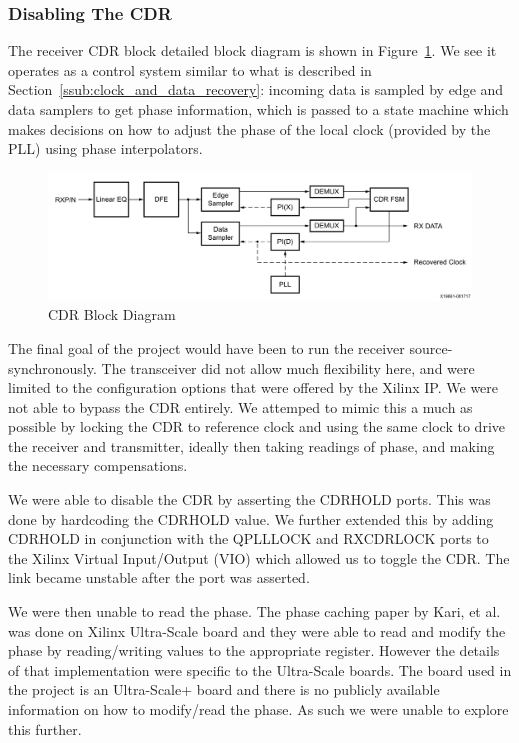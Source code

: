 \subsubsection{Disabling The CDR}%
\label{ssub:disabling_the_cdr}
The receiver CDR block detailed block diagram is shown in
Figure~\ref{fig:cdr_detail}. We see it operates as a control system similar to
what is described in Section~\ref{ssub:clock_and_data_recovery}:
incoming data is sampled by edge and data samplers to get phase information,
which is passed to a state machine which makes decisions on how to adjust
the phase of the local clock (provided by the PLL) using phase interpolators.

\begin{figure}[ht]
    \centering
    \hspace*{-1cm}\includegraphics[width=1.2\linewidth]{img/cdr_detail}
    \caption{CDR Block Diagram}%
    \label{fig:cdr_detail}
\end{figure}

The final goal of the project would have been to run the receiver
source-synchronously.  The transceiver did not allow much flexibility here, and
were limited to the configuration options that were offered by the Xilinx IP.
We were not able to bypass the CDR entirely. We attemped to mimic this a much
as possible by locking the CDR to reference clock and using the same clock to
drive the receiver and transmitter, ideally then taking readings of phase, and
making the necessary compensations.
 
We were able to disable the CDR by asserting the CDRHOLD ports. This was done
by hardcoding the CDRHOLD value. We further extended this by adding CDRHOLD in
conjunction with the QPLLLOCK and RXCDRLOCK ports to the Xilinx Virtual
Input/Output (VIO) which allowed us to toggle the CDR.  The link became
unstable after the port was asserted.  

We were then unable to read the phase. The phase caching paper by Kari, et al.
\cite{kari_phase} was done on Xilinx Ultra-Scale board and they were able to
read and modify the phase by reading/writing values to the appropriate register.
However the details of that implementation were specific to the Ultra-Scale
boards. The board used in the project is an Ultra-Scale+ board and there is no
publicly available information on how to modify/read the phase. 
As such we were unable to explore this further.

